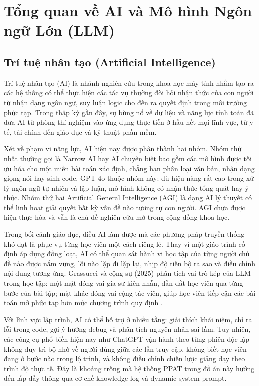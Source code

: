 \documentclass[../main.tex]{subfiles}
\begin{document}
\section{Tổng quan về AI và Mô hình Ngôn ngữ Lớn (LLM)}

\subsection{Trí tuệ nhân tạo (Artificial Intelligence)}

Trí tuệ nhân tạo (AI) là nhánh nghiên cứu trong khoa học máy tính nhằm tạo ra các hệ thống có thể thực hiện các tác vụ thường đòi hỏi nhận thức của con người từ nhận dạng ngôn ngữ, suy luận logic cho đến ra quyết định trong môi trường phức tạp. Trong thập kỷ gần đây, sự bùng nổ về dữ liệu và năng lực tính toán đã đưa AI từ phòng thí nghiệm vào ứng dụng thực tiễn ở hầu hết mọi lĩnh vực, từ y tế, tài chính đến giáo dục và kỹ thuật phần mềm.

Xét về phạm vi năng lực, AI hiện nay được phân thành hai nhóm. Nhóm thứ nhất thường gọi là Narrow AI hay AI chuyên biệt bao gồm các mô hình được tối ưu hóa cho một miền bài toán xác định, chẳng hạn phân loại văn bản, nhận dạng giọng nói hay sinh code. GPT-4o thuộc nhóm này: dù hiệu năng rất cao trong xử lý ngôn ngữ tự nhiên và lập luận, mô hình không có nhận thức tổng quát hay ý thức. Nhóm thứ hai Artificial General Intelligence (AGI) là dạng AI lý thuyết có thể linh hoạt giải quyết bất kỳ vấn đề nào tương tự con người. AGI chưa được hiện thực hóa và vẫn là chủ đề nghiên cứu mở trong cộng đồng khoa học.

Trong bối cảnh giáo dục, điều AI làm được mà các phương pháp truyền thống khó đạt là phục vụ từng học viên một cách riêng lẻ. Thay vì một giáo trình cố định áp dụng đồng loạt, AI có thể quan sát hành vi học tập của từng người chủ đề nào được nắm vững, lỗi nào lặp đi lặp lại, nhịp độ tiến bộ ra sao và điều chỉnh nội dung tương ứng. Grassucci và cộng sự (2025) phân tích vai trò kép của LLM trong học tập: một mặt đóng vai gia sư kiên nhẫn, dẫn dắt học viên qua từng bước của bài tập; mặt khác đóng vai cộng tác viên, giúp học viên tiếp cận các bài toán mở phức tạp hơn mức chương trình quy định \cite{grassucci2026beyond}.

Với lĩnh vực lập trình, AI có thể hỗ trợ ở nhiều tầng: giải thích khái niệm, chỉ ra lỗi trong code, gợi ý hướng debug và phân tích nguyên nhân sai lầm. Tuy nhiên, các công cụ phổ biến hiện nay như ChatGPT vận hành theo từng phiên độc lập không duy trì bộ nhớ về người dùng giữa các lần truy cập, không biết học viên đang ở bước nào trong lộ trình, và không điều chỉnh chiến lược giảng dạy theo trình độ thực tế. Đây là khoảng trống mà hệ thống PPAT trong đồ án này hướng đến lấp đầy thông qua cơ chế knowledge log và dynamic system prompt.
\end{document}
